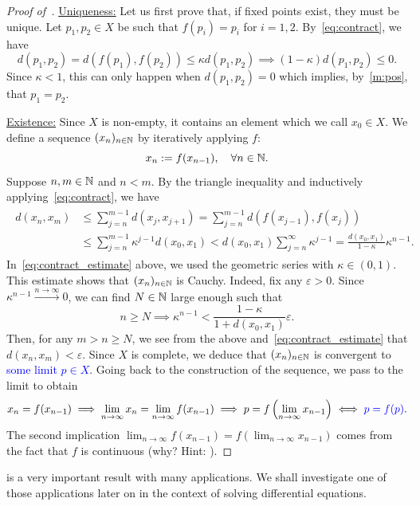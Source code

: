 \begin{proof}[Proof of~]
	\ul{Uniqueness:} Let us first prove that, if fixed points exist, they must be unique. Let $p_1,p_2\in X$ be such that $f(p_i)=p_i$ for $i=1,2$. By~\eqref{eq:contract}, we have
	\[
	d(p_1,p_2) = d(f(p_1),f(p_2)) \le \kappa d(p_1,p_2)\implies (1-\kappa)d(p_1,p_2)\le 0.
	\]
	Since $\kappa<1$, this can only happen when $d(p_1,p_2) = 0$ which implies, by~\ref{m:pos}, that $p_1=p_2$.
	
	\ul{Existence:} Since $X$ is non-empty, it contains an element which we call $x_0 \in X$. We define a sequence $(x_n)_{n\in\mathbb{N}}$ by iteratively applying $f$:
	\[
	x_n := f(x_{n-1}),\quad \forall n\in\mathbb{N}.
	\]
	Suppose $n,m\in \mathbb{N}$ and $n<m$. By the triangle inequality and inductively applying~\eqref{eq:contract}, we have
	\begin{align}
		\label{eq:contract_estimate}
		\begin{split}
		d(x_n,x_m) &\le \sum_{j=n}^{m-1}d(x_j,x_{j+1}) = \sum_{j=n}^{m-1}d(f(x_{j-1}),f(x_j)) 	\\
		&\le \sum_{j=n}^{m-1}\kappa^{j-1}d(x_0,x_1) < d(x_0,x_1)\sum_{j=n}^\infty \kappa^{j-1} = \frac{d(x_0,x_1)}{1-\kappa}\kappa^{n-1}.
		\end{split}
	\end{align}
	In~\eqref{eq:contract_estimate} above, we used the geometric series with $\kappa\in(0,1)$. This estimate shows that $(x_n)_{n\in\mathbb{N}}$ is Cauchy. Indeed, fix any $\varepsilon>0$. Since $\kappa^{n-1}\overset{n\to \infty}{\to}0$, we can find $N\in\mathbb{N}$ large enough such that
	\[
	n\ge N \implies \kappa^{n-1} < \frac{1-\kappa}{1 + d(x_0,x_1)}\varepsilon.
	\]
	Then, for any $m>n\ge N$, we see from the above and~\eqref{eq:contract_estimate} that $d(x_n,x_m)<\varepsilon$. Since $X$ is complete, we deduce that $(x_n)_{n\in\mathbb{N}}$ is convergent to \textcolor{blue}{some limit $p\in X$}. Going back to the construction of the sequence, we pass to the limit to obtain
	\[
	x_n = f(x_{n-1})\implies \lim_{n\to \infty} x_n = \lim_{n\to \infty}f(x_{n-1}) \implies p = f\left(\lim_{n\to \infty}x_{n-1}\right) \iff \textcolor{blue}{p = f(p)}.
	\]
	The second implication $\lim_{n\to \infty}f(x_{n-1}) = f\left(\lim_{n\to \infty}x_{n-1}\right)$ comes from the fact that $f$ is continuous (why? Hint: ). 
\end{proof}
 is a very important result with many applications. We shall investigate one of those applications later on in the context of solving differential equations.